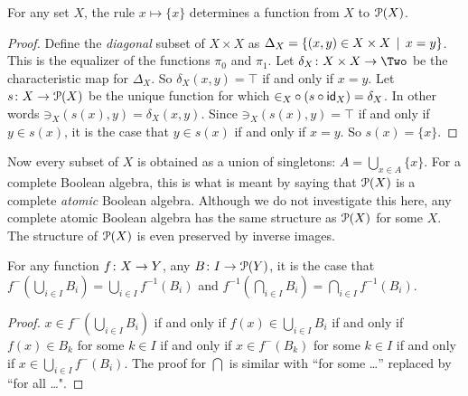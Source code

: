 \begin{lemma}
	For any set $X$, the rule $x\mapsto \{x\}$ determines a function from $X$ to ${\mathcal{P}}(X)$.
	
	\begin{proof}
		Define the \emph{diagonal} subset of $X\times X$ as $\Delta_X = \{(x,y)\in X\times X \,\mid\, x= y\}$.
		This is the equalizer of the functions $\pi_0$ and $\pi_1$.
		Let $\fromto {\delta_X}{X\times X}\Two$ be the characteristic map for $\Delta_X$. So $\delta_X(x,y)=\top$ if and only if $x=y$. 
		Let ${s}\colon{X}\to{{\mathcal{P}}(X)}$ be the unique function for which ${\mathord\in}_X\circ (s\circ \textsf{id}_X)= \delta_X$.
		In other words ${\mathord\ni}_X(s(x),y)=\delta_X(x,y)$.
		Since ${\mathord\ni}_X(s(x),y) =\top$ if and only if $y\in s(x)$, it is the case that $y\in s(x)$ if and only if $x=y$.
		So $s(x) = \{x\}$. 
	\end{proof}
\end{lemma}

Now every subset of $X$ is obtained as a union of singletons: $A = \bigcup_{x\in A}\{x\}$. 
For a complete Boolean algebra, this is what is meant by saying that ${\mathcal{P}}(X)$ is a complete \emph{atomic} Boolean algebra. 
Although we do not investigate this here, any complete atomic Boolean algebra has the same structure as ${\mathcal{P}}(X)$ for some $X$. The structure of ${\mathcal{P}}(X)$ is even preserved by inverse images.

\begin{lemma}
	For any function ${f}\colon{X}\to{Y}$, any ${B}\colon{I}\to{{\mathcal{P}}(Y)}$, it is the case that $f^{-}(\bigcup_{i\in I}B_i) = \bigcup_{i\in I}f^{-1}(B_i)$
	and $f^{-1}(\bigcap_{i\in I}B_i) = \bigcap_{i\in I}f^{-1}(B_i)$.
	
	\begin{proof}
		$x\in f^{-}(\bigcup_{i\in I}B_i)$ if and only if $f(x)\in \bigcup_{i\in I}B_i$ if and only if $f(x)\in B_k$ for some $k\in I$ if and only if $x\in f^{-}(B_k)$ for some $k\in I$ if and only if $x\in \bigcup_{i\in I}f^{-}(B_i)$.
		The proof for $\bigcap$ is similar with ``for some \ldots'' replaced by ``for all \ldots".  
	\end{proof}
\end{lemma}

